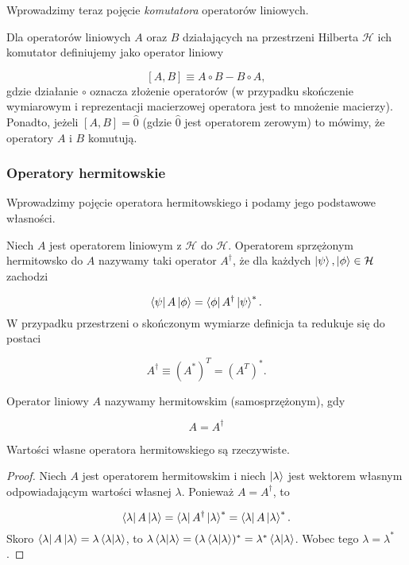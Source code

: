 Wprowadzimy teraz pojęcie \textit{komutatora} operatorów liniowych.

\begin{definition}[Komutator]
    Dla operatorów liniowych $A$ oraz $B$ działających na przestrzeni Hilberta $\mathcal{H}$ ich komutator definiujemy jako operator liniowy

    $$
        [A, B] \equiv A \circ B - B \circ A,
    $$
    gdzie działanie $\circ$ oznacza złożenie operatorów (w przypadku skończenie wymiarowym i reprezentacji macierzowej operatora jest to mnożenie macierzy). Ponadto, jeżeli $[A, B] = \hat{0}$ (gdzie $\hat{0}$ jest operatorem zerowym) to mówimy, że operatory $A$ i $B$ komutują.

\end{definition}

\subsubsection{Operatory hermitowskie}

Wprowadzimy pojęcie operatora hermitowskiego i podamy jego podstawowe własności.

\begin{definition}
    Niech $A$ jest operatorem liniowym z $\mathcal{H}$ do $\mathcal{H}$. Operatorem sprzężonym hermitowsko do $A$ nazywamy taki operator $A ^ {\dag}$, że dla każdych $\ket{\psi}, \ket{\phi} \in \mathcal{H}$ zachodzi

    $$
        \bra{\psi}A\ket{\phi} = \bra{\phi}A^{\dag}\ket{\psi}^{*}.
    $$
    W przypadku przestrzeni o skończonym wymiarze definicja ta redukuje się do postaci

    $$
        A ^ {\dag} \equiv (A ^ {*}) ^ T = (A ^ {T}) ^ {*}.
    $$
\end{definition}

\begin{definition}
    Operator liniowy $A$ nazywamy hermitowskim (samosprzężonym), gdy

    $$
        A = A ^ {\dag}
    $$
\end{definition}

\begin{theorem}
    Wartości własne operatora hermitowskiego są rzeczywiste.
\end{theorem}

\begin{proof}
    Niech $A$ jest operatorem hermitowskim i niech $\ket{\lambda}$ jest wektorem własnym odpowiadającym wartości własnej $\lambda$. Ponieważ $A = A ^ {\dag}$, to

    $$
        \bra{\lambda} A \ket{\lambda} = \bra{\lambda} A ^ {\dag} \ket{\lambda} ^ {*} = \bra{\lambda} A \ket{\lambda} ^ {*}.
    $$
    Skoro $\bra{\lambda} A \ket{\lambda} = \lambda \bra{\lambda}\ket{\lambda}$, to $\lambda \bra{\lambda}\ket{\lambda} = (\lambda \bra{\lambda}\ket{\lambda}) ^ {*} = \lambda ^ {*} \bra{\lambda}\ket{\lambda}$. Wobec tego $\lambda = \lambda ^ {*}$. 
\end{proof}

